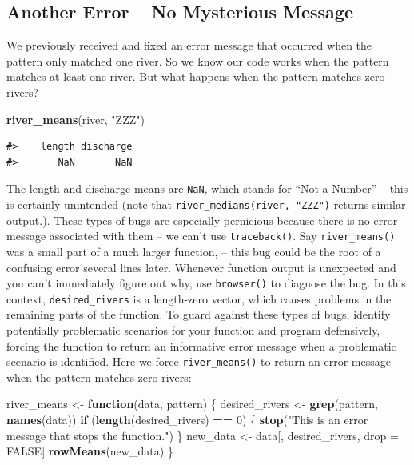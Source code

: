 \documentclass[
]{book}
\newenvironment{Shaded}{\begin{snugshade}}{\end{snugshade}}
\newcommand{\ControlFlowTok}[1]{\textcolor[rgb]{0.13,0.29,0.53}{\textbf{#1}}}
\newcommand{\DecValTok}[1]{\textcolor[rgb]{0.00,0.00,0.81}{#1}}
\newcommand{\KeywordTok}[1]{\textcolor[rgb]{0.13,0.29,0.53}{\textbf{#1}}}
\newcommand{\NormalTok}[1]{#1}
\newcommand{\OperatorTok}[1]{\textcolor[rgb]{0.81,0.36,0.00}{\textbf{#1}}}
\newcommand{\OtherTok}[1]{\textcolor[rgb]{0.56,0.35,0.01}{#1}}
\newcommand{\StringTok}[1]{\textcolor[rgb]{0.31,0.60,0.02}{#1}}
\begin{document}
\hypertarget{error-zeromatch}{%
\subsection{Another Error -- No Mysterious Message}\label{error-zeromatch}}

We previously received and fixed an error message that occurred when the pattern only matched one river. So we know our code works when the pattern matches at least one river. But what happens when the pattern matches zero rivers?

\begin{Shaded}
\begin{Highlighting}[]
\KeywordTok{river_means}\NormalTok{(river, }\StringTok{"ZZZ"}\NormalTok{)}
\end{Highlighting}
\end{Shaded}

\begin{verbatim}
#>    length discharge 
#>       NaN       NaN
\end{verbatim}

The length and discharge means are \texttt{NaN}, which stands for ``Not a Number'' -- this is certainly unintended (note that \texttt{river\_medians(river,\ "ZZZ")} returns similar output.). These types of bugs are especially pernicious because there is no error message associated with them -- we can't use \texttt{traceback()}. Say \texttt{river\_means()} was a small part of a much larger function, -- this bug could be the root of a confusing error several lines later. Whenever function output is unexpected and you can't immediately figure out why, use \texttt{browser()} to diagnose the bug. In this context, \texttt{desired\_rivers} is a length-zero vector, which causes problems in the remaining parts of the function. To guard against these types of bugs, identify potentially problematic scenarios for your function and program defensively, forcing the function to return an informative error message when a problematic scenario is identified. Here we force \texttt{river\_means()} to return an error message when the pattern matches zero rivers:

\begin{Shaded}
\begin{Highlighting}[]
\NormalTok{river_means <-}\StringTok{ }\ControlFlowTok{function}\NormalTok{(data, pattern) \{}
\NormalTok{  desired_rivers <-}\StringTok{ }\KeywordTok{grep}\NormalTok{(pattern, }\KeywordTok{names}\NormalTok{(data))}
  \ControlFlowTok{if}\NormalTok{ (}\KeywordTok{length}\NormalTok{(desired_rivers) }\OperatorTok{==}\StringTok{ }\DecValTok{0}\NormalTok{) \{}
    \KeywordTok{stop}\NormalTok{(}\StringTok{"This is an error message that stops the function."}\NormalTok{)}
\NormalTok{  \}}
\NormalTok{  new_data <-}\StringTok{ }\NormalTok{data[, desired_rivers, drop =}\StringTok{ }\OtherTok{FALSE}\NormalTok{]}
  \KeywordTok{rowMeans}\NormalTok{(new_data)}
\NormalTok{\}}
\end{Highlighting}
\end{Shaded}
\end{document}
